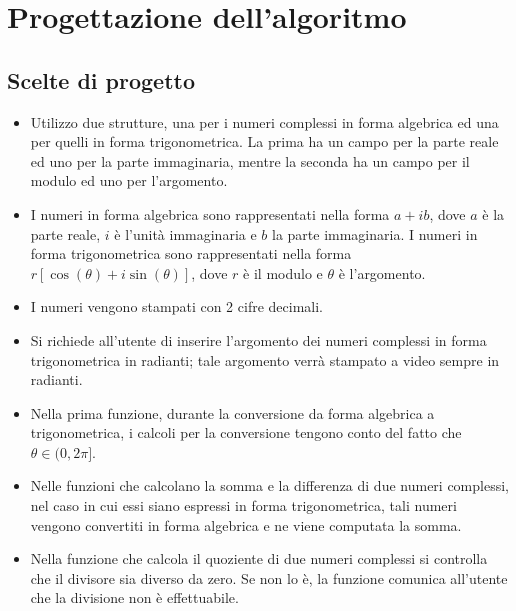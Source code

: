 \documentclass[a4paper,10pt]{article}
\begin{document}
\newpage

\section*{ \textbf{Progettazione dell'algoritmo} }

\subsection*{Scelte di progetto}
\begin{itemize}
	\item Utilizzo due strutture, una per i numeri complessi in forma algebrica ed una per quelli in forma trigonometrica.
	La prima ha un campo per la parte reale ed uno per la parte immaginaria, mentre la seconda ha un campo per il
	modulo ed uno per l'argomento.
	\item I numeri in forma algebrica sono rappresentati nella forma $ a + ib $, dove $a$ è la parte reale, $i$ è
	l'unità immaginaria e $b$ la parte immaginaria. I numeri in forma trigonometrica sono rappresentati nella forma
	$ r[\cos(\theta) + i\sin(\theta)] $, dove $r$ è il modulo e $\theta$ è l'argomento.
	\item I numeri vengono stampati con 2 cifre decimali.
	\item Si richiede all'utente di inserire l'argomento dei numeri complessi in forma trigonometrica in radianti; tale
	argomento verrà stampato a video sempre in radianti.
	\item Nella prima funzione, durante la conversione da forma algebrica a trigonometrica, i calcoli per la conversione
	tengono conto del fatto che $ \theta \in (0,2\pi] $.
	\item Nelle funzioni che calcolano la somma e la differenza di due numeri complessi, nel caso in cui essi siano 
	espressi in forma trigonometrica, tali numeri vengono convertiti in forma algebrica e ne viene computata la somma.
	\item Nella funzione che calcola il quoziente di due numeri complessi si controlla che il divisore sia diverso da zero.
	Se non lo è, la funzione comunica all'utente che la divisione non è effettuabile.
\end{itemize}
\end{document}

